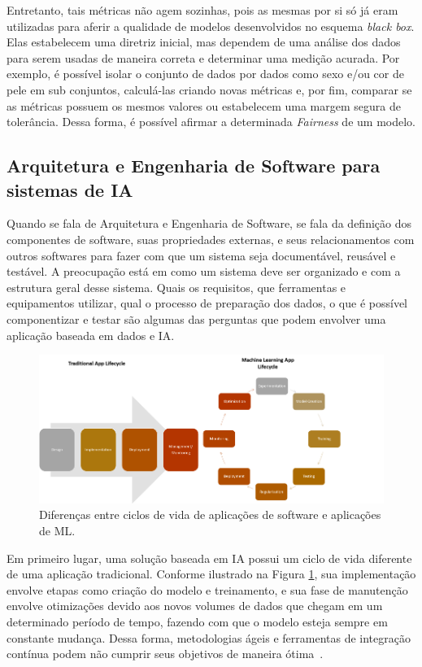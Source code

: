 \documentclass[portugues, 12pt, a4paper]{article}
\begin{document}
Entretanto, tais métricas não agem sozinhas, pois as mesmas por si só já eram utilizadas para aferir a qualidade de modelos desenvolvidos no esquema \textit{black box}. Elas estabelecem uma diretriz inicial, mas dependem de uma análise dos dados para serem usadas de maneira correta e determinar uma medição acurada. Por exemplo, é possível isolar o conjunto de dados por dados como sexo e/ou cor de pele em sub conjuntos, calculá-las criando novas métricas e, por fim, comparar se as métricas possuem os mesmos valores ou estabelecem uma margem segura de tolerância. Dessa forma, é possível afirmar  a determinada \textit{Fairness} de um modelo.

\subsection{Arquitetura e Engenharia de Software para sistemas de IA}

Quando se fala de Arquitetura e Engenharia de Software, se fala da definição dos componentes de software, suas propriedades externas, e seus relacionamentos com outros softwares para fazer com que um sistema seja documentável, reusável e testável. A preocupação está em como um sistema deve ser organizado e com a estrutura geral desse sistema. Quais os requisitos, que ferramentas e equipamentos utilizar, qual o processo de preparação dos dados, o que é possível componentizar e testar são algumas das perguntas que podem envolver uma aplicação baseada em dados e IA.

\begin{figure}[h]
\centering
\includegraphics[scale=0.5]{images/ai_lifecycle.png}
\caption {Diferenças entre ciclos de vida de aplicações de software e aplicações de ML.~\citep{Rodriguez_2020}}
\label{fig:AILifeCycle}
\end{figure}

Em primeiro lugar, uma solução baseada em IA possui um ciclo de vida diferente de uma aplicação tradicional. Conforme ilustrado na Figura \ref{fig:AILifeCycle}, sua implementação envolve etapas como criação do modelo e treinamento, e sua fase de manutenção envolve otimizações devido aos novos volumes de dados que chegam em um determinado período de tempo, fazendo com que o modelo esteja sempre em constante mudança. Dessa forma, metodologias ágeis e ferramentas de integração contínua podem não cumprir seus objetivos de maneira ótima~\citep{Rodriguez_2020}.
\end{document}
